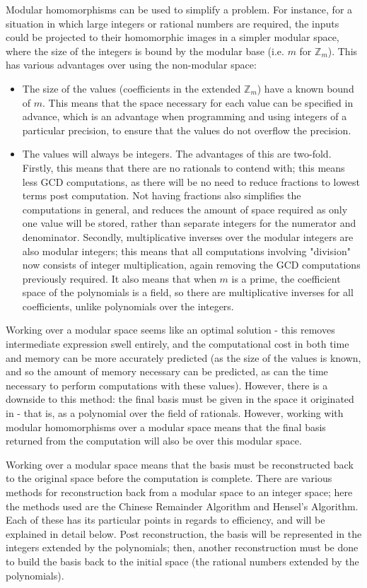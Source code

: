 \documentclass[letterpaper,12pt,titlepage,oneside,final]{book}
\begin{document}
Modular homomorphisms can be used to simplify a problem.  For instance, for a situation in which large integers or rational numbers are required, the inputs could be projected to their homomorphic images in a simpler modular space, where the size of the integers is bound by the modular base (i.e. ${m}$ for ${\mathbb{Z}_m}$).  This has various advantages over using the non-modular space:
\begin{itemize}
  \item The size of the values (coefficients in the extended ${\mathbb{Z}_m}$) have a known bound of ${m}$.  This means that the space necessary for each value can be specified in advance, which is an advantage when programming and using integers of a particular precision, to ensure that the values do not overflow the precision.
  \item The values will always be integers.  The advantages of this are two-fold.  Firstly, this means that there are no rationals to contend with; this means less GCD computations, as there will be no need to reduce fractions to lowest terms post computation.  Not having fractions also simplifies the computations in general, and reduces the amount of space required as only one value will be stored, rather than separate integers for the numerator and denominator.  Secondly, multiplicative inverses over the modular integers are also modular integers; this means that all computations involving "division" now consists of integer multiplication, again removing the GCD computations previously required.  It also means that when ${m}$ is a prime, the coefficient space of the polynomials is a field, so there are multiplicative inverses for all coefficients, unlike polynomials over the integers.
\end{itemize}

Working over a modular space seems like an optimal solution - this removes intermediate expression swell entirely, and the computational cost in both time and memory can be more accurately predicted (as the size of the values is known, and so the amount of memory necessary can be predicted, as can the time necessary to perform computations with these values).  However, there is a downside to this method: the final basis must be given in the space it originated in - that is, as a polynomial over the field of rationals.  However, working with modular homomorphisms over a modular space means that the final basis returned from the computation will also be over this modular space.  

Working over a modular space means that the basis must be reconstructed back to the original space before the computation is complete.  There are various methods for reconstruction back from a modular space to an integer space; here the methods used are the Chinese Remainder Algorithm and Hensel's Algorithm.  Each of these has its particular points in regards to efficiency, and will be explained in detail below.  Post reconstruction, the basis will be represented in the integers extended by the polynomials; then, another reconstruction must be done to build the basis back to the initial space (the rational numbers extended by the polynomials).    
\end{document}
